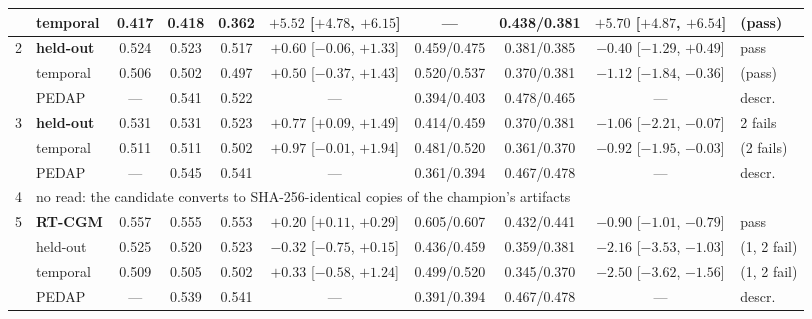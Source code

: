 \documentclass[10pt,twocolumn]{article}
\begin{document}
\begin{table}[!tp]
\begin{tabular}{@{}clcccccccl@{}}
  & temporal & 0.417 & 0.418 & 0.362 & $+5.52$ [$+4.78$, $+6.15$] & --- & 0.438/0.381 & $+5.70$ [$+4.87$, $+6.54$] & (pass) \\
\midrule
2 & \textbf{held-out} & 0.524 & 0.523 & 0.517 & $+0.60$ [$-0.06$, $+1.33$] & 0.459/0.475 & 0.381/0.385 & $-0.40$ [$-1.29$, $+0.49$] & pass \\
  & temporal & 0.506 & 0.502 & 0.497 & $+0.50$ [$-0.37$, $+1.43$] & 0.520/0.537 & 0.370/0.381 & $-1.12$ [$-1.84$, $-0.36$] & (pass) \\
  & PEDAP & --- & 0.541 & 0.522 & --- & 0.394/0.403 & 0.478/0.465 & --- & descr. \\
\midrule
3 & \textbf{held-out} & 0.531 & 0.531 & 0.523 & $+0.77$ [$+0.09$, $+1.49$] & 0.414/0.459 & 0.370/0.381 & $-1.06$ [$-2.21$, $-0.07$] & 2 fails \\
  & temporal & 0.511 & 0.511 & 0.502 & $+0.97$ [$-0.01$, $+1.94$] & 0.481/0.520 & 0.361/0.370 & $-0.92$ [$-1.95$, $-0.03$] & (2 fails) \\
  & PEDAP & --- & 0.545 & 0.541 & --- & 0.361/0.394 & 0.467/0.478 & --- & descr. \\
\midrule
4 & \multicolumn{9}{l}{no read: the candidate converts to SHA-256-identical copies of the champion's artifacts} \\
\midrule
5 & \textbf{RT-CGM} & 0.557 & 0.555 & 0.553 & $+0.20$ [$+0.11$, $+0.29$] & 0.605/0.607 & 0.432/0.441 & $-0.90$ [$-1.01$, $-0.79$] & pass \\
  & held-out & 0.525 & 0.520 & 0.523 & $-0.32$ [$-0.75$, $+0.15$] & 0.436/0.459 & 0.359/0.381 & $-2.16$ [$-3.53$, $-1.03$] & (1, 2 fail) \\
  & temporal & 0.509 & 0.505 & 0.502 & $+0.33$ [$-0.58$, $+1.24$] & 0.499/0.520 & 0.345/0.370 & $-2.50$ [$-3.62$, $-1.56$] & (1, 2 fail) \\
  & PEDAP & --- & 0.539 & 0.541 & --- & 0.391/0.394 & 0.467/0.478 & --- & descr. \\
\bottomrule
\end{tabular}
\end{table}
\end{document}
